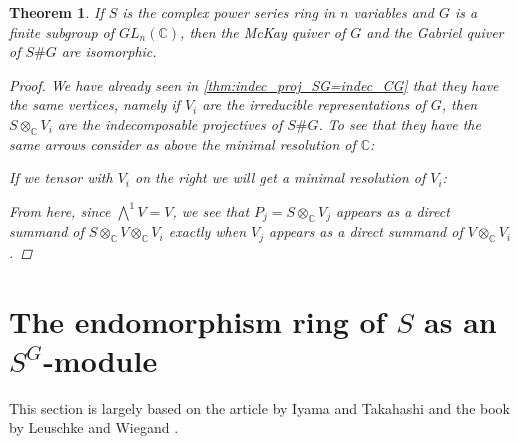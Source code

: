 \documentclass[11pt, a4paper, english]{article}
\newtheorem{theorem}{Theorem}[section]
\theoremstyle{definition}
\newcommand{\C}{\mathbb{C}}
\begin{document}
\begin{theorem}
\label{thm:gabriel_equals_mckay}
If $S$ is the complex power series ring in $n$ variables and $G$ is a finite subgroup of $GL_n(\C)$, then the McKay quiver of $G$ and the Gabriel quiver of $S\#G$ are isomorphic.
\begin{proof}
We have already seen in \cref{thm:indec_proj_SG=indec_CG} that they have the same vertices, namely if $V_i$ are the irreducible representations of $G$, then $S \otimes_\C V_i$ are the indecomposable projectives of $S\#G$. To see that they have the same arrows consider as above the minimal resolution of $\C$:
\begin{center}
\end{center}
If we tensor with $V_i$ on the right we will get a minimal resolution of $V_i$:
\begin{center}
\end{center}
From here, since $\bigwedge\limits^{1} V = V$, we see that $P_j = S \otimes_\C V_j$ appears as a direct summand of $S \otimes_\C V \otimes_\C V_i$ exactly when $V_j$ appears as a direct summand of $V \otimes_\C V_i$.
\end{proof}
\end{theorem}

\section{The endomorphism ring of $S$ as an $S^G$-module}
This section is largely based on the article by Iyama and Takahashi \cite{IyTa} and the book by Leuschke and Wiegand \cite{LW12}.
\end{document}
